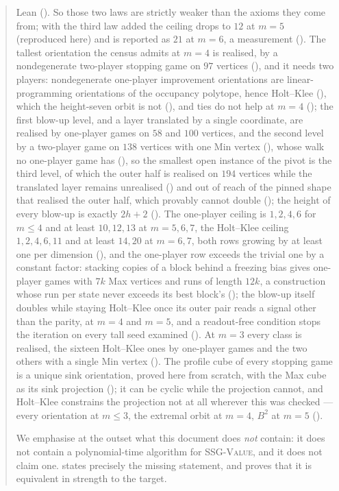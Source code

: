 \documentclass[11pt]{article}
\theoremstyle{plain}
\theoremstyle{definition}
\begin{document}
\begin{abstract}
Lean (). So those two
laws are strictly weaker than the axioms they come from; with the third
law added the ceiling drops to $12$ at $m=5$ (reproduced here) and is
reported as $21$ at $m=6$, a measurement (). The tallest orientation the
census admits at $m=4$ is realised, by a nondegenerate two-player stopping
game on $97$ vertices (), and it needs two players:
nondegenerate one-player improvement orientations are linear-programming
orientations of the occupancy polytope, hence Holt--Klee
(), which the height-seven orbit is not
(), and ties do not help at $m=4$
(); the first blow-up level, and a layer translated by
a single coordinate, are realised by one-player games on $58$ and $100$
vertices, and the second level by a two-player game on $138$ vertices with
one Min vertex (), whose
walk no one-player game has (), so the smallest open
instance of the pivot is the third level, of which the outer half is
realised on $194$ vertices while the translated layer remains unrealised
() and out of reach of the pinned shape that realised
the outer half, which provably cannot double ();
the height of every blow-up is exactly $2h+2$
(). The one-player ceiling is
$1,2,4,6$ for $m\le4$ and at least $10,12,13$ at $m=5,6,7$, the Holt--Klee
ceiling $1,2,4,6,11$ and at least $14,20$ at $m=6,7$, both rows growing by
at least one per dimension
(),
and the one-player row exceeds the trivial one by a constant factor:
stacking copies of a block behind a freezing bias gives one-player games
with $7k$ Max vertices and runs of length $12k$, a construction whose
run per state never exceeds its best block's
(); the blow-up
itself doubles while staying Holt--Klee once its outer pair reads a
signal other than the parity, at $m=4$ and $m=5$, and a readout-free
condition stops the iteration on every tall seed examined
(). At $m=3$ every class is realised,
the sixteen Holt--Klee ones by one-player games and the two others with a
single Min vertex (). The profile cube of every
stopping game is a unique sink orientation, proved here from scratch,
with the Max cube as its sink projection
(); it can be cyclic while the
projection cannot, and Holt--Klee constrains the projection not at all
wherever this was checked --- every orientation at $m\le3$, the extremal
orbit at $m=4$, $B^{2}$ at $m=5$ ().

We emphasise at the outset what this document does \emph{not} contain: it
does not contain a polynomial-time algorithm for \textsc{SSG-Value}, and
it does not claim one.  states precisely the missing
statement, and proves that it is equivalent in strength to the target.
\end{abstract}
\end{document}
